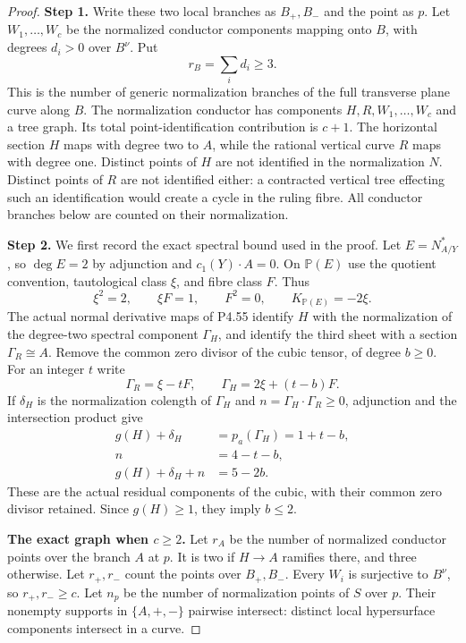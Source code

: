 \begin{proof}
\noindent\textbf{Step 1.} Write these two local branches as $B_+,B_-$ and the
point as $p$. Let $W_1,\ldots,W_c$ be the normalized
conductor components mapping onto $B$, with degrees
$d_i>0$ over $B^\nu$. Put
\[
                         r_B=\sum_i d_i\ge3.
\]
This is the number of generic normalization branches
of the full transverse plane curve along $B$.
The normalization conductor has components
$H,R,W_1,\ldots,W_c$ and a tree graph. Its total
point-identification contribution is $c+1$.
The horizontal section $H$ maps with degree two to
$A$, while the rational vertical curve $R$ maps
with degree one. Distinct points of $H$ are not
identified in the normalization $N$. Distinct
points of $R$ are not identified either: a
contracted vertical tree effecting such an
identification would create a cycle in the ruling
fibre. All conductor branches below are counted
on their normalization.

\noindent\textbf{Step 2.} We first record the exact spectral bound used in
the proof. Let $E=N_{A/Y}^*$, so $\deg E=2$ by
adjunction and $c_1(Y)\cdot A=0$. On $\mathbb P(E)$
use the quotient convention, tautological class
$\xi$, and fibre class $F$. Thus
\[
          \xi^2=2,\qquad \xi F=1,\qquad F^2=0,
          \qquad K_{\mathbb P(E)}=-2\xi.
\]
The actual normal derivative maps of P4.55 identify
$H$ with the normalization of the degree-two
spectral component $\Gamma_H$, and identify the
third sheet with a section $\Gamma_R\cong A$.
Remove the common zero divisor of the cubic tensor,
of degree $b\ge0$. For an integer $t$ write
\[
       \Gamma_R=\xi-tF,\qquad
       \Gamma_H=2\xi+(t-b)F.
\]
If $\delta_H$ is the normalization colength of
$\Gamma_H$ and $n=\Gamma_H\cdot\Gamma_R\ge0$,
adjunction and the intersection product give
\[
 \begin{split}
       g(H)+\delta_H&=p_a(\Gamma_H)=1+t-b,\\
       n&=4-t-b,\\
       g(H)+\delta_H+n&=5-2b.
 \end{split}                                                   \tag{R20.1}
\]
These are the actual residual components of the
cubic, with their common zero divisor retained.
Since $g(H)\ge1$, they imply $b\le2$.

\par\medskip\noindent\textbf{The exact graph when $c\ge2$.}
Let $r_A$ be the number of normalized conductor
points over the branch $A$ at $p$. It is two if
$H\to A$ ramifies there, and three otherwise.
Let $r_+,r_-$ count the points over $B_+,B_-$.
Every $W_i$ is surjective to $B^\nu$, so
$r_+,r_-\ge c$. Let $n_p$ be the number of
normalization points of $S$ over $p$.
Their nonempty supports in $\{A,+,-\}$ pairwise
intersect: distinct local hypersurface components
intersect in a curve.


\end{proof}
